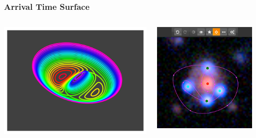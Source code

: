 \documentclass{beamer}
\begin{document}

\begin{frame}
  \frametitle{Arrival Time Surface}
  \begin{columns}[c]
  	\begin{column}{0.45\textwidth}
	  	\includegraphics[width=\textwidth]{imgs/arriv_2}
  	\end{column}
  	\begin{column}{0.45\textwidth}
	  	\includegraphics[width=\textwidth]{imgs/screenshot}
  	\end{column}
  \end{columns}
\end{frame}
\end{document}
